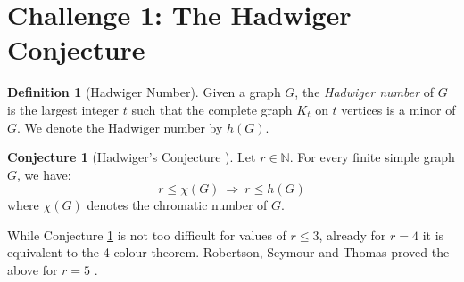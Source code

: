 \documentclass[12pt]{article}
\numberwithin{equation}{section}
\theoremstyle{definition}
\newtheorem{definition}{Definition}
\newtheorem{conjecture}[theorem]{Conjecture}
\newcommand{\ev}[1]{( #1 )}
\begin{document}
\section*{Challenge 1: The Hadwiger Conjecture}


\begin{definition}[Hadwiger Number]
Given a graph $G$, the \textit{Hadwiger number} of $G$ is the largest integer $t$ such that the complete graph $K_t$ on $t$ vertices is a minor of $G$.
We denote the Hadwiger number by $h\ev{G}$.
\end{definition}

\begin{conjecture}[Hadwiger's Conjecture
\mbox{\cite[Conjecture 1]{steiner}}]\label{hadw}
Let $r\in \mathbb{N}$.
For every finite simple graph $G$, we have:
$$
r \leq \chi\ev{G} \ \Longrightarrow \  r \leq h\ev{G} 
$$
where $\chi\ev{G}$ denotes the chromatic number of $G$. 
\end{conjecture}

While Conjecture \ref{hadw} is not too difficult for values of $r\leq 3$, already for $r=4$ it is equivalent to the 4-colour theorem. 
Robertson, Seymour and Thomas proved the above for $r= 5$ \cite{RobertsonSeymourThomas1993Hadwiger}. 

\printbibliography
\end{document}
